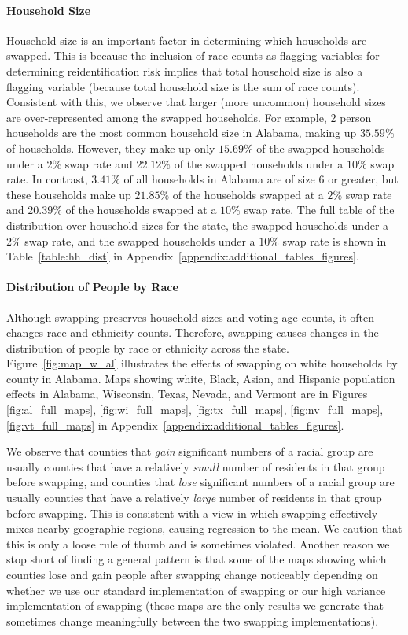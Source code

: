 \paragraph{Household Size} Household size is an important factor in determining which households are swapped. This is because the inclusion of race counts as flagging variables for determining reidentification risk implies that total household size is also a flagging variable (because total household size is the sum of race counts). Consistent with this, we observe that larger (more uncommon) household sizes are over-represented among the swapped households. For example, 2 person households are the most common household size in Alabama, making up $35.59\%$ of households. However, they make up only $15.69\%$ of the swapped households under a $2\%$ swap rate and $22.12\%$ of the swapped households under a $10\%$ swap rate. In contrast, $3.41\%$ of all households in Alabama are of size 6 or greater, but these households make up $21.85\%$ of the households swapped at a $2\%$ swap rate and $20.39\%$ of the households swapped at a $10\%$ swap rate. The full table of the distribution over household sizes for the state, the swapped households under a $2\%$ swap rate, and the swapped households under a $10\%$ swap rate is shown in Table~\ref{table:hh_dist} in Appendix~\ref{appendix:additional_tables_figures}.

\paragraph{Distribution of People by Race} Although swapping preserves household sizes and voting age counts, it often changes race and ethnicity counts. Therefore, swapping causes changes in the distribution of people by race or ethnicity across the state.
Figure~\ref{fig:map_w_al} illustrates the effects of swapping on white households by county in Alabama. Maps showing white, Black, Asian, and Hispanic population effects in Alabama, Wisconsin, Texas, Nevada, and Vermont are in Figures \ref{fig:al_full_maps}, \ref{fig:wi_full_maps}, \ref{fig:tx_full_maps}, \ref{fig:nv_full_maps}, \ref{fig:vt_full_maps} in Appendix~\ref{appendix:additional_tables_figures}.

We observe that counties that \emph{gain} significant numbers of a racial group are usually counties that have a relatively \emph{small} number of residents in that group before swapping, and counties that \emph{lose} significant numbers of a racial group are usually counties that have a relatively \emph{large} number of residents in that group before swapping. This is consistent with a view in which swapping effectively mixes nearby geographic regions, causing regression to the mean. We caution that this is only a loose rule of thumb and is sometimes violated. Another reason we stop short of finding a general pattern is that some of the maps showing which counties lose and gain people after swapping change noticeably depending on whether we use our standard implementation of swapping or our high variance implementation of swapping (these maps are the only results we generate that sometimes change meaningfully between the two swapping implementations).

